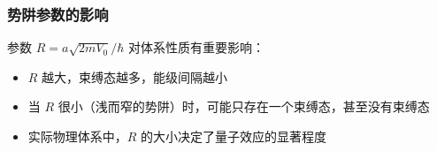 \subsubsection*{势阱参数的影响}
参数 $R = a\sqrt{2mV_0}/\hbar$ 对体系性质有重要影响：
\begin{itemize}
	\item $R$ 越大，束缚态越多，能级间隔越小
	\item 当 $R$ 很小（浅而窄的势阱）时，可能只存在一个束缚态，甚至没有束缚态
	\item 实际物理体系中，$R$ 的大小决定了量子效应的显著程度
\end{itemize}
